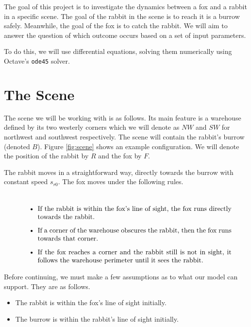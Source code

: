 The goal of this project is to investigate the dynamics between a fox and a rabbit in a specific scene. The goal of the rabbit in the scene is to reach it is a burrow safely. Meanwhile, the goal of the fox is to catch the rabbit. We will aim to answer the question of which outcome occurs based on a set of input parameters.

To do this, we will use differential equations, solving them numerically using Octave's \texttt{ode45} solver.

\section{The Scene}

The scene we will be working with is as follows. Its main feature is a warehouse defined by its two westerly corners which we will denote as $NW$ and $SW$ for northwest and southwest respectively. The scene will contain the rabbit's burrow (denoted $B$). Figure \ref{fig:scene} shows an example configuration. We will denote the position of the rabbit by $R$ and the fox by $F$.

The rabbit moves in a straightforward way, directly towards the burrow with constant speed $s_{r0}$. The fox moves under the following rules.

\begin{equation}
\label{lbl:movementRules}
\begin{array}{p{0.9\textwidth}}
\begin{itemize}

\item If the rabbit is within the fox's line of sight, the fox runs directly towards the rabbit.

\item If a corner of the warehouse obscures the rabbit, then the fox runs towards that corner.

\item If the fox reaches a corner and the rabbit still is not in sight, it follows the warehouse perimeter until it sees the rabbit.
\end{itemize}
  \end{array}
\end{equation}

Before continuing, we must make a few assumptions as to what our model can support. They are as follows.

\begin{itemize}

\item The rabbit is within the fox's line of sight initially.
\item The burrow is within the rabbit's line of sight initially.

\end{itemize}

